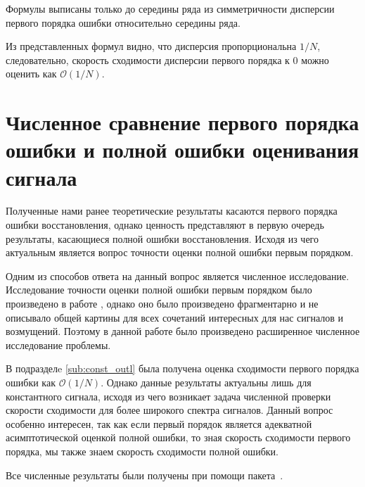 \documentclass[specialist,
               substylefile = spbu.rtx,
               subf,href,colorlinks=true, 12pt]{disser}
\begin{document}
Формулы выписаны только до середины ряда из симметричности дисперсии первого порядка ошибки относительно середины ряда.

Из представленных формул видно, что дисперсия пропорциональна $1/N$, следовательно, скорость сходимости дисперсии первого порядка к $0$ можно оценить как $\mathcal{O}(1/N)$.

\section{Численное сравнение первого порядка ошибки и полной ошибки оценивания сигнала}

Полученные нами ранее теоретические результаты касаются первого порядка ошибки восстановления, однако ценность представляют в первую очередь результаты, касающиеся полной ошибки восстановления. Исходя из чего актуальным является вопрос точности оценки полной ошибки первым порядком.

Одним из способов ответа на данный вопрос является численное исследование. Исследование точности оценки полной ошибки первым порядком было произведено в работе \cite{SenBach}, однако оно было произведено фрагментарно и не описывало общей картины для всех сочетаний интересных для нас сигналов и возмущений. Поэтому в данной работе было произведено расширенное численное исследование проблемы.

В подразделe \ref{sub:const_outl} была получена оценка сходимости первого порядка ошибки как $\mathcal{O}(1/N)$. Однако данные результаты актуальны лишь для константного сигнала, исходя из чего возникает задача численной проверки скорости сходимости для более широкого спектра сигналов. Данный вопрос особенно интересен, так как если первый порядок является адекватной асимптотической оценкой полной ошибки, то зная скорость сходимости первого порядка, мы также знаем скорость сходимости полной ошибки.

Все численные результаты были получены при помощи пакета~\cite{Korobeynikov.etal2014}.
\end{document}
